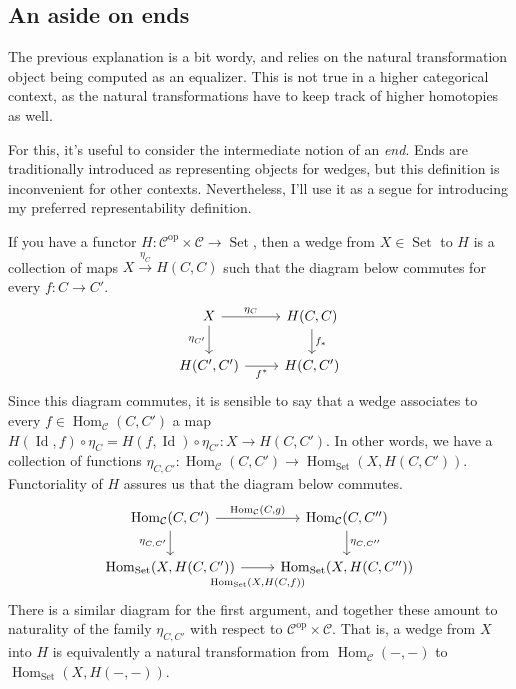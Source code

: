 \documentclass{article}
\newcommand{\C}{\mathcal{C}}
\newcommand{\op}{{\tempop}}
\DeclareMathOperator{\Hom}{Hom}
\DeclareMathOperator{\Id}{Id}
\DeclareMathOperator{\Set}{Set}
\DeclareMathOperator{\tempop}{op}
\theoremstyle{definition}
\begin{document}
\subsection{An aside on ends}
The previous explanation is a bit wordy, and relies on the natural transformation object being computed as an equalizer.
This is not true in a higher categorical context, as the natural transformations have to keep track of higher homotopies as well.

For this, it's useful to consider the intermediate notion of an \textit{end}.
Ends are traditionally introduced as representing objects for wedges, but this definition is inconvenient for other contexts.
Nevertheless, I'll use it as a segue for introducing my preferred representability definition.

If you have a functor $H : \C^\op \times \C \to \Set$, then a wedge from $X \in \Set$ to $H$ is a collection of maps $X \xrightarrow{\eta_C} H(C, C)$ such that  the diagram below commutes for every $f : C \to C'$.
\[\begin{tikzcd}
	X & {H(C, C)} \\
	{H(C', C')} & {H(C, C')}
	\arrow["{\eta_C}", from=1-1, to=1-2]
	\arrow["{\eta_{C'}}"', from=1-1, to=2-1]
	\arrow["{f_*}", from=1-2, to=2-2]
	\arrow["{f^*}"', from=2-1, to=2-2]
\end{tikzcd}\]
Since this diagram commutes, it is sensible to say that a wedge associates to every $f \in \Hom_\C(C, C')$ a map $H(\Id, f) \circ \eta_C = H(f, \Id) \circ \eta_{C'} : X \to H(C, C')$.
In other words, we have a collection of functions $\eta_{C, C'} : \Hom_\C(C, C') \to \Hom_{\Set}(X, H(C, C'))$.
Functoriality of $H$ assures us that the diagram below commutes.
\[\begin{tikzcd}
	{\Hom_\C(C, C')} & {\Hom_\C(C, C'')} \\
	{\Hom_{\Set}(X, H(C, C'))} & {\Hom_{\Set}(X, H(C, C''))}
	\arrow["{\Hom_\C(C, g)}", from=1-1, to=1-2]
	\arrow["{\eta_{C, C'}}"', from=1-1, to=2-1]
	\arrow["{\eta_{C, C''}}", from=1-2, to=2-2]
	\arrow["{\Hom_{\Set}(X, H(C, f))}"', shift right=2, draw=none, from=2-1, to=2-2]
	\arrow[from=2-1, to=2-2]
\end{tikzcd}\]
There is a similar diagram for the first argument, and together these amount to naturality of the family $\eta_{C, C'}$ with respect to $\C^\op \times \C$.
That is, a wedge from $X$ into $H$ is equivalently a natural transformation from $\Hom_\C(-, -)$ to $\Hom_{\Set}(X, H(-, -))$.
\end{document}
